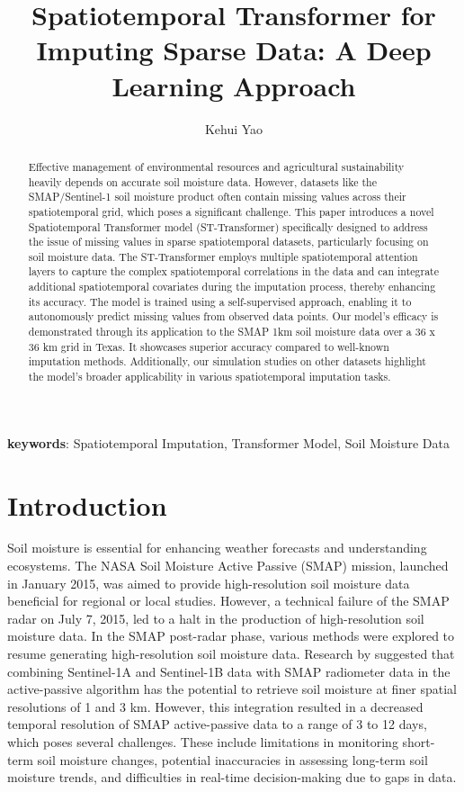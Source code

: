 \documentclass[11pt]{article}
\title{Spatiotemporal Transformer for Imputing Sparse Data: A Deep Learning Approach}
\author[1]{Kehui Yao}
\affil[1]{Department of Statistics, University of Wisconsin-Madison}
\date{}
\begin{document}
\maketitle

\begin{abstract}
	Effective management of environmental resources and agricultural sustainability heavily depends on accurate soil moisture data. However, datasets like the SMAP/Sentinel-1 soil moisture product often contain missing values across their spatiotemporal grid, which poses a significant challenge. This paper introduces a novel Spatiotemporal Transformer model (ST-Transformer) specifically designed to address the issue of missing values in sparse spatiotemporal datasets, particularly focusing on soil moisture data. The ST-Transformer employs multiple spatiotemporal attention layers to capture the complex spatiotemporal correlations in the data and can integrate additional spatiotemporal covariates during the imputation process, thereby enhancing its accuracy. The model is trained using a self-supervised approach, enabling it to autonomously predict missing values from observed data points. Our model's efficacy is demonstrated through its application to the SMAP 1km soil moisture data over a 36 x 36 km grid in Texas. It showcases superior accuracy compared to well-known imputation methods. Additionally, our simulation studies on other datasets highlight the model's broader applicability in various spatiotemporal imputation tasks.
\end{abstract}

\textbf{keywords}: Spatiotemporal Imputation, 
Transformer Model, Soil Moisture Data

\section{Introduction}
Soil moisture is essential for enhancing weather forecasts and understanding ecosystems. The NASA Soil Moisture Active Passive (SMAP) mission, launched in January 2015, was aimed to provide high-resolution soil moisture data beneficial for regional or local studies. However, a technical failure of the SMAP radar on July 7, 2015, led to a halt in the production of high-resolution soil moisture data. In the SMAP post-radar phase, various methods were explored to resume generating high-resolution soil moisture data. Research by \citet{das2019smap} suggested that combining Sentinel-1A and Sentinel-1B data with SMAP radiometer data in the active-passive algorithm has the potential to retrieve soil moisture at finer spatial resolutions of 1 and 3 km. However, this integration resulted in a decreased temporal resolution of SMAP active-passive data to a range of 3 to 12 days, which poses several challenges. These include limitations in monitoring short-term soil moisture changes, potential inaccuracies in assessing long-term soil moisture trends, and difficulties in real-time decision-making due to gaps in data.
\end{document}

